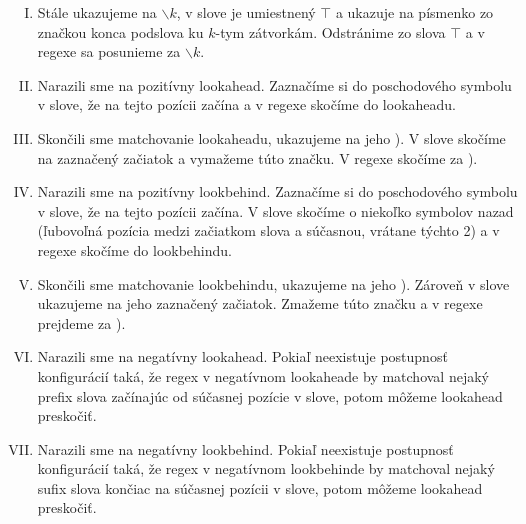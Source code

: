 \begin{df}
\begin{enumerate}[I.]
\item Stále ukazujeme na $\backslash k$, v slove je umiestnený $\intercal$ a ukazuje na písmenko zo značkou konca podslova ku $k$-tym zátvorkám. Odstránime zo slova $\intercal$ a v regexe sa posunieme za $\backslash k$.
\item Narazili sme na pozitívny lookahead. Zaznačíme si do poschodového symbolu v slove, že na tejto pozícii začína a v regexe skočíme do lookaheadu.
\item Skončili sme matchovanie lookaheadu, ukazujeme na jeho ). V slove skočíme na zaznačený začiatok a vymažeme túto značku. V regexe skočíme za ).
\item Narazili sme na pozitívny lookbehind. Zaznačíme si do poschodového symbolu v slove, že na tejto pozícii začína. V slove skočíme o niekoľko symbolov nazad (ľubovoľná pozícia medzi začiatkom slova a súčasnou, vrátane týchto 2) a v regexe skočíme do lookbehindu.
\item Skončili sme matchovanie lookbehindu, ukazujeme na jeho ). Zároveň v slove ukazujeme na jeho zaznačený začiatok. Zmažeme túto značku a v regexe prejdeme za ).
\item Narazili sme na negatívny lookahead. Pokiaľ neexistuje postupnosť konfigurácií taká, že regex v negatívnom lookaheade by matchoval nejaký prefix slova začínajúc od súčasnej pozície v slove, potom môžeme lookahead preskočiť.
\item Narazili sme na negatívny lookbehind. Pokiaľ neexistuje postupnosť konfigurácií taká, že regex v negatívnom lookbehinde by matchoval nejaký sufix slova končiac na súčasnej pozícii v slove, potom môžeme lookahead preskočiť.

\end{enumerate}


\end{df}
